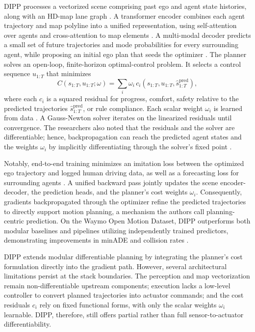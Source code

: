 DIPP processes a vectorized scene comprising past ego and agent state histories, along with an HD-map lane graph \cite{huang_DifferentiableIntegratedMotion_2024}.
A transformer encoder combines each agent trajectory and map polyline into a unified representation, using self-attention over agents and cross-attention to map elements \cite{vaswani_AttentionAllYou_2017}.
A multi-modal decoder predicts a small set of future trajectories and mode probabilities for every surrounding agent, while proposing an initial ego plan that seeds the optimizer \cite{huang_DifferentiableIntegratedMotion_2024}.
The planner solves an open-loop, finite-horizon optimal-control problem.
It selects a control sequence $u_{1:T}$ that minimizes
\begin{equation}
    C\!\left(s_{1:T}, u_{1:T}; \omega\right) = \sum_i \omega_i\, c_i\!\left(s_{1:T}, u_{1:T}, \hat{s}^{\text{pred}}_{1:T}\right),
\end{equation}
where each $c_i$ is a squared residual for progress, comfort, safety relative to the predicted trajectories $\hat{s}^{\text{pred}}_{1:T}$, or rule compliance.
Each scalar weight $\omega_i$ is learned from data \cite{huang_DifferentiableIntegratedMotion_2024}.
A Gauss-Newton solver iterates on the linearized residuals until convergence.
The researchers also noted that the residuals and the solver are differentiable; hence, backpropagation can reach the predicted agent states and the weights $\omega_i$ by implicitly differentiating through the solver's fixed point \cite{huang_DifferentiableIntegratedMotion_2024}.

Notably, end-to-end training minimizes an imitation loss between the optimized ego trajectory and logged human driving data, as well as a forecasting loss for surrounding agents \cite{huang_DifferentiableIntegratedMotion_2024}.
A unified backward pass jointly updates the scene encoder-decoder, the prediction heads, and the planner's cost weights $\omega_i$.
Consequently, gradients backpropagated through the optimizer refine the predicted trajectories to directly support motion planning, a mechanism the authors call planning-centric prediction.
On the Waymo Open Motion Dataset, DIPP outperforms both modular baselines and pipelines utilizing independently trained predictors, demonstrating improvements in minADE and collision rates  \cite{huang_DifferentiableIntegratedMotion_2024}.

DIPP extends modular differentiable planning by integrating the planner's cost formulation directly into the gradient path. 
However, several architectural limitations persist at the stack boundaries.
The perception and map vectorization remain non-differentiable upstream components; execution lacks a low-level controller to convert planned trajectories into actuator commands; and the cost residuals $c_i$ rely on fixed functional forms, with only the scalar weights $\omega_i$ learnable.
DIPP, therefore, still offers partial rather than full sensor-to-actuator differentiability.

